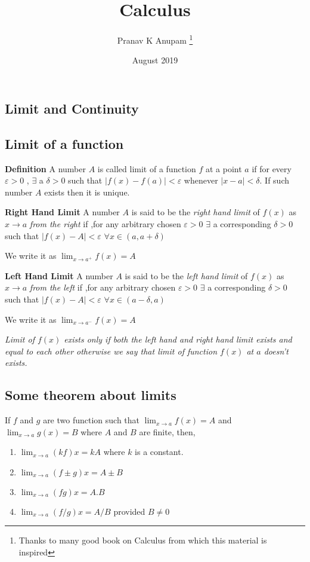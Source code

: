 \documentclass[10pt,a4paper]{article}
\title{Calculus}
\author{Pranav K Anupam \thanks{Thanks to many good book on Calculus from which this material is  inspired }}
\date{August 2019}
\begin{document}
\begin{titlepage}
\maketitle
\end{titlepage}
\tableofcontents
\clearpage
\begin{center}
\section{ Limit and Continuity}
\end{center}
\subsection{Limit of a function}
\textbf{Definition } A number $A$ is called limit of a function $f$ at a point $a$ if for every $\varepsilon > 0$ , $\exists$ a $\delta>0$ such that $|f(x)-f(a)|<\varepsilon$ whenever $|x-a|<\delta$. If such number $A$ exists then it is unique.\par
\textbf{Right Hand Limit } A number $A$ is said to be the \emph{right hand limit} of $f(x)$ as $x \to a$ \emph{from the right} if ,for any arbitrary chosen $\varepsilon>0$ $\exists$ a corresponding $\delta>0$ such that $|f(x)-A|<\varepsilon$ $\forall x \in (a,a+\delta) $ \par 
We write it as $\displaystyle{\lim_{x \to a^+} f(x)}=A$ \par
\textbf{Left Hand Limit } A number $A$ is said to be the \emph{left hand limit} of $f(x)$ as $x \to a$ \emph{from the left} if ,for any arbitrary chosen $\varepsilon>0$ $\exists$ a corresponding $\delta>0$ such that $|f(x)-A|<\varepsilon$ $\forall x \in (a-\delta,a) $ \par 
We write it as $\displaystyle{\lim_{x \to a^-} f(x)}=A$ \par
\emph{Limit of $f(x)$ exists only if both the left hand and right hand limit exists and equal to each other otherwise we say that limit of function $f(x)$ at $a$ doesn't exists.}
\subsection{Some theorem about limits}
If $f$ and $g$ are two function such that $\displaystyle{\lim_{x \to a} f(x)}= A$ and $\displaystyle{\lim_{x \to a} g(x)}= B$ where $A$ and $B$ are finite, then, 
\begin{enumerate}
\item $\displaystyle{\lim_{x \to a}} (kf) x = kA$ where $k$ is a constant. 
\item $\displaystyle{\lim_{x \to a}} (f \pm g) x = A \pm B $
\item $\displaystyle{\lim_{x \to a}} (f g) x = A.B $
\item $\displaystyle{\lim_{x \to a}} (f / g) x = A/B $ provided $B \neq 0$

\end{enumerate}
\end{document}
